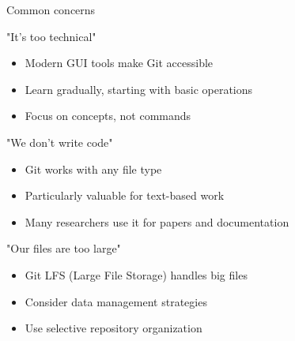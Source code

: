 \documentclass[aspectratio=1609]{beamer}
\begin{document}
    \begin{frame}{Common concerns}
        \vspace{-0.6cm}
        \footnotesize
        \begin{tblock}{{"It's too technical"}}
            \begin{itemize}
                \item Modern GUI tools make Git accessible
                \item Learn gradually, starting with basic operations
                \item Focus on concepts, not commands
            \end{itemize}
            \end{tblock}
            
            \begin{tblock}{{"We don't write code"}}
            \begin{itemize}
                \item Git works with any file type
                \item Particularly valuable for text-based work
                \item Many researchers use it for papers and documentation
            \end{itemize}
            \end{tblock}
            
            \begin{tblock}{{"Our files are too large"}}
            \begin{itemize}
                \item Git LFS (Large File Storage) handles big files
                \item Consider data management strategies
                \item Use selective repository organization
            \end{itemize}
            \end{tblock}
            
        
    \end{frame}
\end{document}
